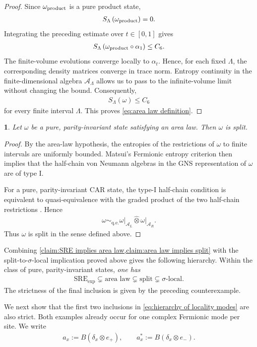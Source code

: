 \documentclass[a4paper,10pt]{article}
\numberwithin{equation}{section}
\theoremstyle{plain}
\theoremstyle{plain}
\theoremstyle{plain}
\theoremstyle{plain}
\theoremstyle{plain}
\newtheorem{claim}[claim]{\protect\claimname}
\theoremstyle{remark}
\theoremstyle{definition}
\providecommand{\claimname}{Claim}
\newcommand{\calA}{\mathcal{A}}
\newcommand{\eq}[1]{\begin{align*}#1\end{align*}}
\newcommand{\eql}[1]{\begin{align}#1\end{align}}
\newcommand{\br}[1]{\left(#1\right)}
\begin{document}
\begin{proof}
Since $\omega_{\rm product}$ is a pure product state,
\eq{
    S_\Lambda
    \br{
        \omega_{\rm product}
    }
    =
    0.
}
Integrating the preceding estimate over $t\in[0,1]$ gives
\eq{
    S_\Lambda
    \br{
        \omega_{\rm product}\circ\alpha_1
    }
    \leq
    C_6.
}
The finite-volume evolutions converge locally to $\alpha_t$. Hence, for
each fixed $\Lambda$, the corresponding density matrices converge in
trace norm. Entropy continuity in the finite-dimensional algebra
$\calA_\Lambda$ allows us to pass to the infinite-volume limit without
changing the bound. Consequently,
\eq{
    S_\Lambda(\omega)
    \leq
    C_6
}
for every finite interval $\Lambda$. This proves
\cref{eq:area law definition}.
\end{proof}

\begin{claim}
\label{claim:area law implies split}
Let $\omega$ be a pure, parity-invariant state satisfying an area law.
Then $\omega$ is split.
\end{claim}

\begin{proof}
By the area-law hypothesis, the entropies of the restrictions of
$\omega$ to finite intervals are uniformly bounded. Matsui's
Fermionic entropy criterion
\cite[Theorem~1.8]{Matsui2013Split} then implies that the half-chain von
Neumann algebras in the GNS representation of $\omega$ are of type I.

For a pure, parity-invariant CAR state, the type-I half-chain condition
is equivalent to quasi-equivalence with the graded product of the two
half-chain restrictions
\cite[Theorem~1.3]{Matsui2020SplitFermionicString}. Hence
\eq{
    \omega
    \sim_{\mathrm{q.e.}}
    \left.\omega\right|_{\calA_L}
    \hat{\otimes}
    \left.\omega\right|_{\calA_R}.
}
Thus $\omega$ is split in the sense defined above.
\end{proof}

Combining
\cref{claim:SRE implies area law,claim:area law implies split}
with the split-to-$\sigma$-local implication proved above gives the
following hierarchy. Within the class of pure, parity-invariant states,
\emph{one has}
\eql{\label{eq:hierarchy of locality modes}
\boxed{
\mathrm{SRE}_{\exp}
\subsetneq
\text{area law}
\subsetneq
\text{split}
\subsetneq
\sigma\text{-local}.
}
}
The strictness of the final inclusion is given by the preceding
counterexample. 

We next show that the first two inclusions in
\cref{eq:hierarchy of locality modes} are also strict. Both examples
already occur for one complex Fermionic mode per site. We write
\eq{
    a_x
    :=
    B(\delta_x\otimes e_+),
    \qquad
    a_x^*
    :=
    B(\delta_x\otimes e_-).
}
\end{document}
